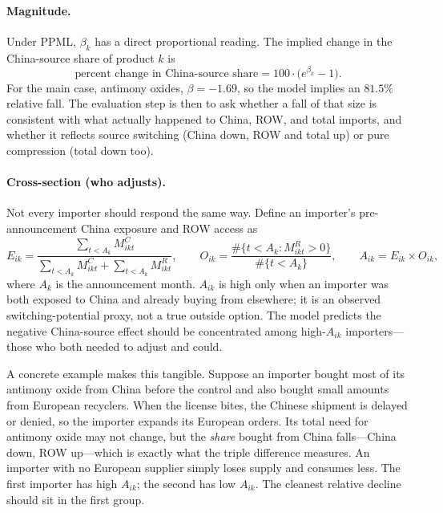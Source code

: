 \documentclass[12pt,a4paper]{article}
\begin{document}
\paragraph{Magnitude.} Under PPML, $\beta_k$ has a direct proportional reading.
The implied change in the China-source share of product $k$ is
\begin{equation}
\text{percent change in China-source share} = 100\cdot\bigl(e^{\beta_k}-1\bigr).
\label{eq:magnitude}
\end{equation}
For the main case, antimony oxides, $\beta=-1.69$, so the model implies an
$81.5\%$ relative fall. The evaluation step is then to ask whether a fall of that
size is consistent with what actually happened to China, ROW, and total imports,
and whether it reflects source switching (China down, ROW and total up) or pure
compression (total down too).

\paragraph{Cross-section (who adjusts).} Not every importer should respond the
same way. Define an importer's pre-announcement China exposure and ROW access as
\begin{equation}
E_{ik}=\frac{\sum_{t<A_k} M^{C}_{ikt}}
              {\sum_{t<A_k} M^{C}_{ikt}+\sum_{t<A_k} M^{R}_{ikt}},
\qquad
O_{ik}=\frac{\#\{t<A_k: M^{R}_{ikt}>0\}}{\#\{t<A_k\}},
\qquad
A_{ik}=E_{ik}\times O_{ik},
\label{eq:switching}
\end{equation}
where $A_k$ is the announcement month. $A_{ik}$ is high only when an importer was
both exposed to China and already buying from elsewhere; it is an observed
switching-potential proxy, not a true outside option. The model predicts the
negative China-source effect should be concentrated among high-$A_{ik}$
importers---those who both needed to adjust and could.

A concrete example makes this tangible. Suppose an importer bought most of its
antimony oxide from China before the control and also bought small amounts from
European recyclers. When the license bites, the Chinese shipment is delayed or
denied, so the importer expands its European orders. Its total need for antimony
oxide may not change, but the \emph{share} bought from China falls---China down,
ROW up---which is exactly what the triple difference measures. An importer with
no European supplier simply loses supply and consumes less. The first importer
has high $A_{ik}$; the second has low $A_{ik}$. The cleanest relative decline
should sit in the first group.
\end{document}
